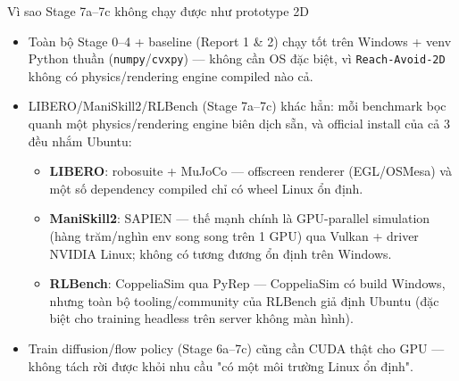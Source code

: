 \documentclass[aspectratio=169]{beamer}
\begin{document}
\begin{frame}[t,shrink=8]{Vì sao Stage 7a--7c không chạy được như prototype 2D}
\begin{itemize}
    \item Toàn bộ Stage 0--4 + baseline (Report 1 \& 2) chạy tốt trên Windows + venv Python thuần (\texttt{numpy}/\texttt{cvxpy}) --- không cần OS đặc biệt, vì \texttt{Reach-Avoid-2D} không có physics/rendering engine compiled nào cả.
    \item LIBERO/ManiSkill2/RLBench (Stage 7a--7c) khác hẳn: mỗi benchmark bọc quanh một physics/rendering engine biên dịch sẵn, và official install của cả 3 đều nhắm Ubuntu:
    \begin{itemize}
        \item \textbf{LIBERO}: robosuite + MuJoCo --- offscreen renderer (EGL/OSMesa) và một số dependency compiled chỉ có wheel Linux ổn định.
        \item \textbf{ManiSkill2}: SAPIEN --- thế mạnh chính là GPU-parallel simulation (hàng trăm/nghìn env song song trên 1 GPU) qua Vulkan + driver NVIDIA Linux; không có tương đương ổn định trên Windows.
        \item \textbf{RLBench}: CoppeliaSim qua PyRep --- CoppeliaSim có build Windows, nhưng toàn bộ tooling/community của RLBench giả định Ubuntu (đặc biệt cho training headless trên server không màn hình).
    \end{itemize}
    \item Train diffusion/flow policy (Stage 6a--7c) cũng cần CUDA thật cho GPU --- không tách rời được khỏi nhu cầu "có một môi trường Linux ổn định".
\end{itemize}
\end{frame}
\end{document}
